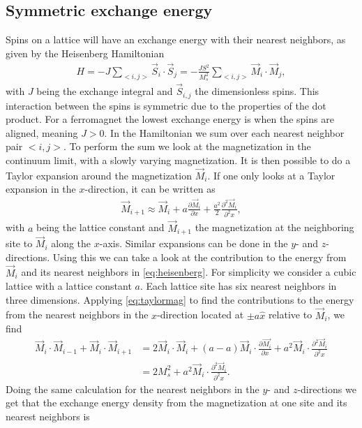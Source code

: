 \documentclass[12pt, a4paper]{article}		%
\numberwithin{equation}{section}
\begin{document}
\subsection{Symmetric exchange energy}
Spins on a lattice will have an exchange energy with their nearest neighbors, as given by the Heisenberg Hamiltonian
\begin{align}
\label{eq:heisenberg}
H = -J\sum_{<i, j>} \vec{S}_i\cdot\vec{S}_j = -\frac{J S^2}{M_s^2}\sum_{<i, j>} \vec{M}_i\cdot\vec{M}_j,
\end{align}
with $J$ being the exchange integral and $\vec{S}_{i,j}$ the dimensionless spins. This interaction between the spins is symmetric due to the properties of the dot product. For a ferromagnet the lowest exchange energy is when the spins are aligned, meaning $J>0$. In the Hamiltonian we sum over each nearest neighbor pair $<i, j>$. To perform the sum we look at the magnetization in the continuum limit, with a slowly varying magnetization. It is then possible to do a Taylor expansion around the magnetization $\vec{M}_i$. If one only looks at a Taylor expansion in the $x$-direction, it can be written as
\begin{align}
\label{eq:taylormag}
\vec{M}_{i+1} \approx \vec{M}_i + a\frac{\partial \vec{M}_i}{\partial x} + \frac{a^2}{2}\frac{\partial^2 \vec{M}_i}{\partial^2 x},
\end{align}
with $a$ being the lattice constant and $\vec{M}_{i+1}$ the magnetization at the neighboring site to $\vec{M}_i$ along the $x$-axis. Similar expansions can be done in the $y$- and $z$-directions. Using this we can take a look at the contribution to the energy from $\vec{M}_i$ and its nearest neighbors in \eqref{eq:heisenberg}. For simplicity we consider a cubic lattice with a lattice constant $a$. Each lattice site has six nearest neighbors in three dimensions. Applying \eqref{eq:taylormag} to find the contributions to the energy from the nearest neighbors in the $x$-direction located at $\pm a \hat{x}$ relative to $\vec{M}_i$, we find
\begin{align*}
\vec{M}_i\cdot\vec{M}_{i-1}+\vec{M}_i\cdot\vec{M}_{i+1} &= 2\vec{M}_i\cdot\vec{M}_i + (a - a) \vec{M}_i\cdot\frac{\partial \vec{M_i}}{\partial x} + a^2\vec{M}_i\cdot\frac{\partial^2 \vec{M}_i}{\partial^2 x} \\
&= 2M_s^2 + a^2\vec{M}_i\cdot\frac{\partial^2 \vec{M}_i}{\partial^2 x}.
\end{align*}
Doing the same calculation for the nearest neighbors in the $y$- and $z$-directions we get that the exchange energy density from the magnetization at one site and its nearest neighbors is
\end{document}
